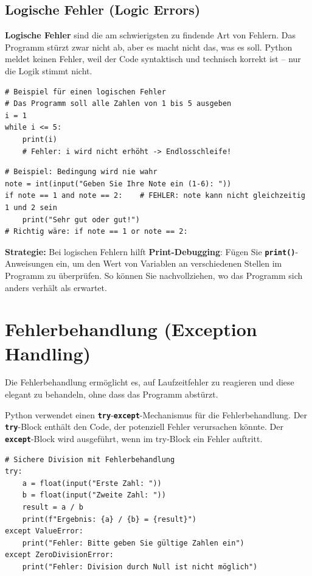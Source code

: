 \documentclass[ngerman,11pt]{article}
\begin{document}
\subsection{Logische Fehler (Logic Errors)}

\textbf{Logische Fehler} sind die am schwierigsten zu findende Art von Fehlern. Das Programm stürzt zwar nicht ab, aber es macht nicht das, was es soll. Python meldet keinen Fehler, weil der Code syntaktisch und technisch korrekt ist -- nur die Logik stimmt nicht.

\begin{lstlisting}[caption=fehler\_logisch.py]
# Beispiel für einen logischen Fehler
# Das Programm soll alle Zahlen von 1 bis 5 ausgeben
i = 1
while i <= 5:
    print(i)
    # Fehler: i wird nicht erhöht -> Endlosschleife!
\end{lstlisting}

\begin{lstlisting}[caption=fehler\_logisch2.py]
# Beispiel: Bedingung wird nie wahr
note = int(input("Geben Sie Ihre Note ein (1-6): "))
if note == 1 and note == 2:    # FEHLER: note kann nicht gleichzeitig 1 und 2 sein
    print("Sehr gut oder gut!")
# Richtig wäre: if note == 1 or note == 2:
\end{lstlisting}

\noindent \textbf{Strategie:} Bei logischen Fehlern hilft \textbf{Print-Debugging}: Fügen Sie \textbf{\texttt{print()}}-Anweisungen ein, um den Wert von Variablen an verschiedenen Stellen im Programm zu überprüfen. So können Sie nachvollziehen, wo das Programm sich anders verhält als erwartet.

\section{Fehlerbehandlung (Exception Handling)}

Die Fehlerbehandlung ermöglicht es, auf Laufzeitfehler zu reagieren und diese elegant zu behandeln, ohne dass das Programm abstürzt.

Python verwendet einen \textbf{\texttt{try}}-\textbf{\texttt{except}}-Mechanismus für die Fehlerbehandlung. Der \textbf{\texttt{try}}-Block enthält den Code, der potenziell Fehler verursachen könnte. Der \textbf{\texttt{except}}-Block wird ausgeführt, wenn im try-Block ein Fehler auftritt.

\begin{lstlisting}[caption=fehlerbehandlung.py]
# Sichere Division mit Fehlerbehandlung
try:
    a = float(input("Erste Zahl: "))
    b = float(input("Zweite Zahl: "))
    result = a / b
    print(f"Ergebnis: {a} / {b} = {result}")
except ValueError:
    print("Fehler: Bitte geben Sie gültige Zahlen ein")
except ZeroDivisionError:
    print("Fehler: Division durch Null ist nicht möglich")
\end{lstlisting}
\end{document}
